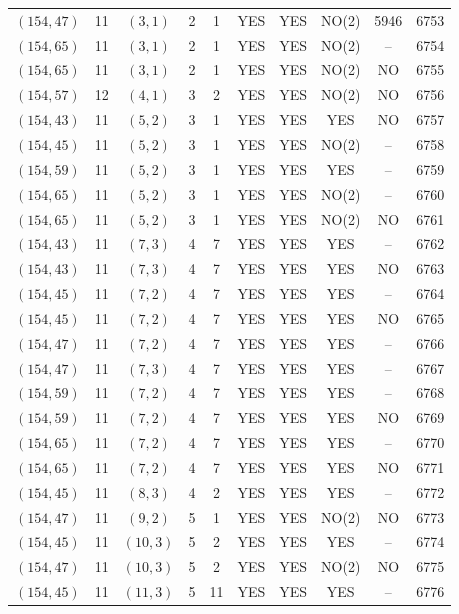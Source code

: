 \begin{longtable}{|c|c|c|c|c|c|c|c|c|c|}
$(154, 47)$ & 11 & $(3, 1)$ & 2 & 1 & YES & YES & NO(2) & 5946 & 6753\\
$(154, 65)$ & 11 & $(3, 1)$ & 2 & 1 & YES & YES & NO(2) & -- & 6754\\
$(154, 65)$ & 11 & $(3, 1)$ & 2 & 1 & YES & YES & NO(2) & NO & 6755\\
$(154, 57)$ & 12 & $(4, 1)$ & 3 & 2 & YES & YES & NO(2) & NO & 6756\\
$(154, 43)$ & 11 & $(5, 2)$ & 3 & 1 & YES & YES & YES & NO & 6757\\
$(154, 45)$ & 11 & $(5, 2)$ & 3 & 1 & YES & YES & NO(2) & -- & 6758\\
$(154, 59)$ & 11 & $(5, 2)$ & 3 & 1 & YES & YES & YES & -- & 6759\\
$(154, 65)$ & 11 & $(5, 2)$ & 3 & 1 & YES & YES & NO(2) & -- & 6760\\
$(154, 65)$ & 11 & $(5, 2)$ & 3 & 1 & YES & YES & NO(2) & NO & 6761\\
$(154, 43)$ & 11 & $(7, 3)$ & 4 & 7 & YES & YES & YES & -- & 6762\\
$(154, 43)$ & 11 & $(7, 3)$ & 4 & 7 & YES & YES & YES & NO & 6763\\
$(154, 45)$ & 11 & $(7, 2)$ & 4 & 7 & YES & YES & YES & -- & 6764\\
$(154, 45)$ & 11 & $(7, 2)$ & 4 & 7 & YES & YES & YES & NO & 6765\\
$(154, 47)$ & 11 & $(7, 2)$ & 4 & 7 & YES & YES & YES & -- & 6766\\
$(154, 47)$ & 11 & $(7, 3)$ & 4 & 7 & YES & YES & YES & -- & 6767\\
$(154, 59)$ & 11 & $(7, 2)$ & 4 & 7 & YES & YES & YES & -- & 6768\\
$(154, 59)$ & 11 & $(7, 2)$ & 4 & 7 & YES & YES & YES & NO & 6769\\
$(154, 65)$ & 11 & $(7, 2)$ & 4 & 7 & YES & YES & YES & -- & 6770\\
$(154, 65)$ & 11 & $(7, 2)$ & 4 & 7 & YES & YES & YES & NO & 6771\\
$(154, 45)$ & 11 & $(8, 3)$ & 4 & 2 & YES & YES & YES & -- & 6772\\
$(154, 47)$ & 11 & $(9, 2)$ & 5 & 1 & YES & YES & NO(2) & NO & 6773\\
$(154, 45)$ & 11 & $(10, 3)$ & 5 & 2 & YES & YES & YES & -- & 6774\\
$(154, 47)$ & 11 & $(10, 3)$ & 5 & 2 & YES & YES & NO(2) & NO & 6775\\
$(154, 45)$ & 11 & $(11, 3)$ & 5 & 11 & YES & YES & YES & -- & 6776\\

\end{longtable}
